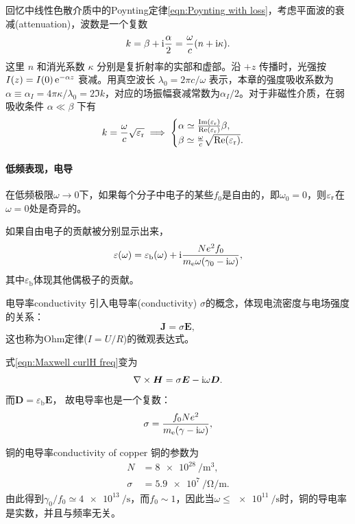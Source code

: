 回忆中线性色散介质中的Poynting定律\eqref{eqn:Poynting with loss}，考虑平面波的衰减(attenuation)，波数是一个复数
\begin{equation}
    \label{eq:ed-complex-propagation-constant}
    k = \beta + \mathrm{i}\frac\alpha 2 = \frac{\omega}{c}(n + \mathrm{i}\kappa).
\end{equation}
这里 $n$ 和消光系数 $\kappa$ 分别是复折射率的实部和虚部。沿 $+z$ 传播时，光强按 $I(z) = I(0)\mathop{}\!\mathrm{e}^{-\alpha z}$ 衰减。用真空波长 $\lambda_0 = 2\pi c/\omega$ 表示，本章的强度吸收系数为$\alpha \equiv \alpha_I = 4\pi\kappa/\lambda_0 = 2\Im k$，对应的场振幅衰减常数为$\alpha_I/2$。对于非磁性介质，在弱吸收条件 $\alpha \ll \beta$ 下有
\[
    k = \frac\omega c\sqrt{\varepsilon_\mathrm r} \implies
    \begin{cases}
        \alpha \simeq \frac{\operatorname{Im}(\varepsilon_\mathrm r)}{\operatorname{Re}(\varepsilon_\mathrm r)}\beta,\\
        \beta \simeq \frac\omega c\sqrt{\operatorname{Re}(\varepsilon_\mathrm r)}.
    \end{cases}
\]

\paragraph{低频表现，电导}

在低频极限$\omega \to 0$下，如果每个分子中电子的某些$f_0$是自由的，即$\omega_0 = 0$，则$\varepsilon_\mathrm r$在$\omega = 0$处是奇异的。

如果自由电子的贡献被分别显示出来，
\[
    \varepsilon(\omega) = \varepsilon_{\mathrm{b}}(\omega) + \mathrm{i}\frac{Ne^2f_0}{m_{\mathrm{e}}\omega(\gamma_0 - \mathrm{i}\omega)},
\]
其中$\varepsilon_{\mathrm{b}}$体现其他偶极子的贡献。

\begin{definition}{电导率}{conductivity}
    引入电导率(conductivity) $\sigma$的概念，体现电流密度与电场强度的关系：
    \begin{equation}
        \bm J = \sigma\bm E,
    \end{equation}
    这也称为Ohm定律($I = U/R$)的微观表达式。
\end{definition}
式\eqref{eqn:Maxwell curlH freq}变为
\[
    \nabla\times\bm H = \sigma\bm E - \mathrm{i}\omega\bm D.
\]
而$\bm D = \varepsilon_{\mathrm{b}}\bm E$，
故电导率也是一个复数：
\begin{equation}
    \sigma = \frac{f_0Ne^2}{m_{\mathrm{e}}(\gamma - \mathrm{i}\omega)},
\end{equation} 
\begin{example}{铜的电导率}{conductivity of copper}
    铜的参数为
    \begin{align*}
        N &= \qty{8e28}{\per\metre\cubed},\\
        \sigma &= \qty{5.9e7}{\per\ohm\per\metre}.
    \end{align*}
    由此得到$\gamma_0/f_0 \simeq \qty{4e13}{\per\second}$，而$f_0 \sim 1$，因此当$\omega \leqslant \qty{e11}{\per\second}$时，铜的导电率是实数，并且与频率无关。
\end{example}

